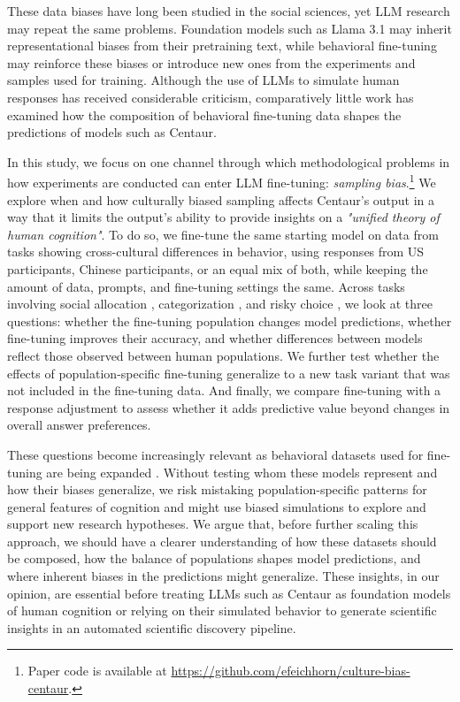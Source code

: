 These data biases have long been studied in the social sciences, yet LLM research may repeat the same problems. Foundation models such as Llama 3.1 may inherit representational biases from their pretraining text, while behavioral fine-tuning may reinforce these biases or introduce new ones from the experiments and samples used for training. Although the use of LLMs to simulate human responses has received considerable criticism, comparatively little work has examined how the composition of behavioral fine-tuning data shapes the predictions of models such as Centaur.


In this study, we focus on one channel through which methodological problems in how experiments are conducted can enter LLM fine-tuning: \textit{sampling bias}.\footnote{Paper code is available at \url{https://github.com/efeichhorn/culture-bias-centaur}.} We explore when and how culturally biased sampling affects Centaur's output in a way that it limits the output's ability to provide insights on a \textit{"unified theory of human cognition"}. To do so, we fine-tune the same starting model on data from tasks showing cross-cultural differences in behavior, using responses from US participants, Chinese participants, or an equal mix of both, while keeping the amount of data, prompts, and fine-tuning settings the same. Across tasks involving social allocation \citep{wang2026decomposing}, categorization \citep{cao2024differences}, and risky choice \citep{anllo2024preferences}, we look at three questions: whether the fine-tuning population changes model predictions, whether fine-tuning improves their accuracy, and whether differences between models reflect those observed between human populations. We further test whether the effects of population-specific fine-tuning generalize to a new task variant that was not included in the fine-tuning data. And finally, we compare fine-tuning with a response adjustment to assess whether it adds predictive value beyond changes in overall answer preferences.

These questions become increasingly relevant as behavioral datasets used for fine-tuning are being expanded \citep{binz2026posttraining}. Without testing whom these models represent and how their biases generalize, we risk mistaking population-specific patterns for general features of cognition and might use biased simulations to explore and support new research hypotheses. We argue that, before further scaling this approach, we should have a clearer understanding of how these datasets should be composed, how the balance of populations shapes model predictions, and where inherent biases in the predictions might generalize. These insights, in our opinion, are essential before treating LLMs such as Centaur as foundation models of human cognition or relying on their simulated behavior to generate scientific insights in an  automated scientific discovery pipeline.

